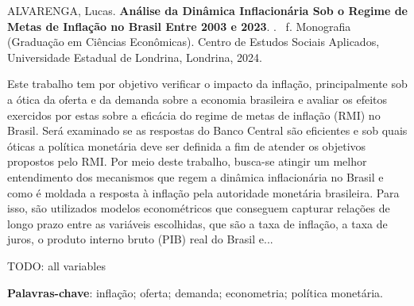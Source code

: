 \documentclass[12pt,oneside,a4paper,chapter=TITLE,english,brazil,sumario=abnt-6027-2012]{abntex2}
\begin{document}
\setlength{\absparsep}{18pt} %
\begin{resumo}

	\noindent
	ALVARENGA, Lucas. {\bfseries Análise da Dinâmica Inflacionária Sob o Regime de Metas de Inflação no Brasil Entre 2003 e 2023}. \imprimirdata. \ztotpages \, f. Monografia (Graduação em Ciências Econômicas). Centro de Estudos Sociais Aplicados, Universidade Estadual de Londrina, Londrina, 2024.
	
	Este trabalho tem por objetivo verificar o impacto da inflação, principalmente sob a ótica da oferta e da demanda sobre a economia brasileira e avaliar os efeitos exercidos por estas sobre a eficácia do regime de metas de inflação (RMI) no Brasil. Será examinado se as respostas do Banco Central são eficientes e sob quais óticas a política monetária deve ser definida a fim de atender os objetivos propostos pelo RMI. Por meio deste trabalho, busca-se atingir um melhor entendimento dos mecanismos que regem a dinâmica inflacionária no Brasil e como é moldada a resposta à inflação pela autoridade monetária brasileira. Para isso, são utilizados modelos econométricos que conseguem capturar relações de longo prazo entre as variáveis escolhidas, que são a taxa de inflação, a taxa de juros, o produto interno bruto (PIB) real do Brasil e... 
	
	TODO: all variables
	
	\textbf{Palavras-chave}: inflação; oferta; demanda; econometria; política monetária.
\end{resumo}








\listoffigures*
\cleardoublepage
\end{document}
